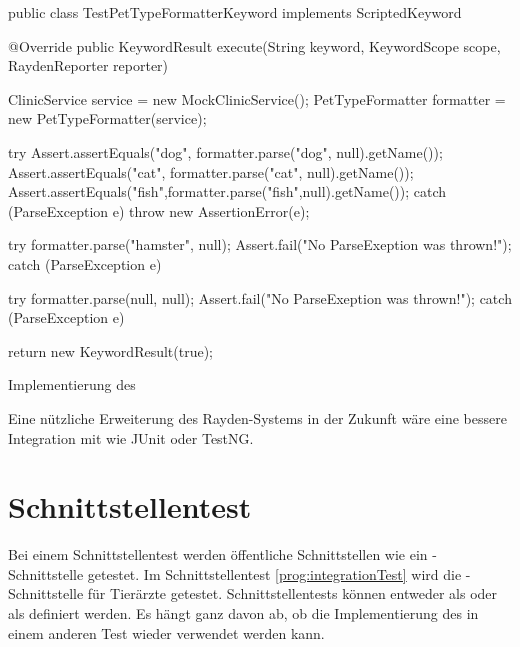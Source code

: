 \begin{program}
\begin{JavaCode}
public class TestPetTypeFormatterKeyword implements ScriptedKeyword {

  @Override
  public KeywordResult execute(String keyword, KeywordScope scope, RaydenReporter reporter) {
    ClinicService service = new MockClinicService();
    PetTypeFormatter formatter = new PetTypeFormatter(service);

    try {
     Assert.assertEquals("dog", formatter.parse("dog", null).getName());
     Assert.assertEquals("cat", formatter.parse("cat", null).getName());
     Assert.assertEquals("fish",formatter.parse("fish",null).getName());
    } catch (ParseException e) {
      throw new AssertionError(e);
    }
    
    try {
      formatter.parse("hamster", null);
      Assert.fail("No ParseExeption was thrown!");
    } catch (ParseException e) {
    }

    try {
      formatter.parse(null, null);
      Assert.fail("No ParseExeption was thrown!");
    } catch (ParseException e) {
    }

    return new KeywordResult(true);
  }
}
\end{JavaCode}
\caption{Implementierung des  }
\label{prog:unitTestImpl}
\end{program}

\SuperPar
Eine nützliche Erweiterung des Rayden-Systems in der Zukunft wäre eine bessere Integration mit  wie JUnit oder TestNG.

\section{Schnittstellentest}
\label{cha:TestenApi}

Bei einem Schnittstellentest werden öffentliche Schnittstellen wie ein -Schnittstelle \cite{Rest} getestet. Im Schnittstellentest \ref{prog:integrationTest} wird die -Schnittstelle für Tierärzte getestet. Schnittstellentests können entweder als  oder als  definiert werden. Es hängt ganz davon ab, ob die Implementierung des  in einem anderen Test wieder verwendet werden kann. 

